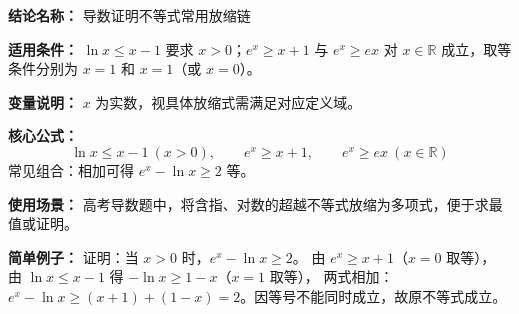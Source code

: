 \textbf{结论名称：} 导数证明不等式常用放缩链

\textbf{适用条件：} $\ln x \le x-1$ 要求 $x>0$；$e^x \ge x+1$ 与 $e^x \ge ex$ 对 $x\in\mathbb{R}$ 成立，取等条件分别为 $x=1$ 和 $x=1$（或 $x=0$）。

\textbf{变量说明：} $x$ 为实数，视具体放缩式需满足对应定义域。

\textbf{核心公式：}
\[
\boxed{\ln x \le x-1\ (x>0),\qquad e^x \ge x+1,\qquad e^x \ge ex\ (x\in\mathbb{R})}
\]
常见组合：相加可得 $e^x - \ln x \ge 2$ 等。

\textbf{使用场景：} 高考导数题中，将含指、对数的超越不等式放缩为多项式，便于求最值或证明。

\textbf{简单例子：} 证明：当 $x>0$ 时，$e^x - \ln x \ge 2$。
由 $e^x \ge x+1$（$x=0$ 取等），
由 $\ln x \le x-1$ 得 $-\ln x \ge 1-x$（$x=1$ 取等），
两式相加：$e^x - \ln x \ge (x+1)+(1-x)=2$。因等号不能同时成立，故原不等式成立。